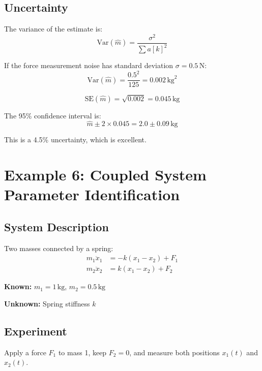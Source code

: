 \subsection{Uncertainty}

The variance of the estimate is:
\begin{equation}
\text{Var}(\hat{m}) = \frac{\sigma^2}{\sum a[k]^2}
\end{equation}

If the force measurement noise has standard deviation $\sigma = 0.5 \, \text{N}$:
\begin{equation}
\text{Var}(\hat{m}) = \frac{0.5^2}{125} = 0.002 \, \text{kg}^2
\end{equation}

\begin{equation}
\text{SE}(\hat{m}) = \sqrt{0.002} = 0.045 \, \text{kg}
\end{equation}

The 95\% confidence interval is:
\begin{equation}
\hat{m} \pm 2 \times 0.045 = 2.0 \pm 0.09 \, \text{kg}
\end{equation}

This is a 4.5\% uncertainty, which is excellent.

\section{Example 6: Coupled System Parameter Identification}

\subsection{System Description}

Two masses connected by a spring:
\begin{align}
m_1 \ddot{x}_1 &= -k(x_1 - x_2) + F_1 \\
m_2 \ddot{x}_2 &= k(x_1 - x_2) + F_2
\end{align}

\textbf{Known:} $m_1 = 1 \, \text{kg}$, $m_2 = 0.5 \, \text{kg}$

\textbf{Unknown:} Spring stiffness $k$

\subsection{Experiment}

Apply a force $F_1$ to mass 1, keep $F_2 = 0$, and measure both positions $x_1(t)$ and $x_2(t)$.

